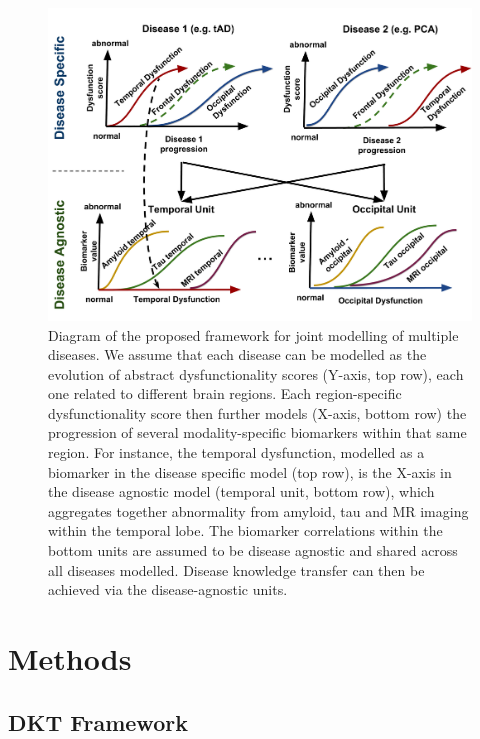 \begin{figure}[h]
 \centering
 \includegraphics[width=1\textwidth,trim=0 0 0 0,clip]{images/disease_knowledge_transfer.pdf}
 \caption[Diagram of the proposed framework for joint modelling of multiple diseases.]{Diagram of the proposed framework for joint modelling of multiple diseases. We assume that each disease can be modelled as the evolution of abstract dysfunctionality scores (Y-axis, top row), each one related to different brain regions. Each region-specific dysfunctionality score then further models (X-axis, bottom row) the progression of several modality-specific biomarkers within that same region. For instance, the temporal dysfunction, modelled as a biomarker in the disease specific model (top row), is the X-axis in the disease agnostic model (temporal unit, bottom row), which aggregates together abnormality from amyloid, tau and MR imaging within the temporal lobe. The biomarker correlations within the bottom units are assumed to be disease agnostic and shared across all diseases modelled. Disease knowledge transfer can then be achieved via the disease-agnostic units.}
 \label{fig:diagram}
\end{figure}

\section{Methods}
\label{sec:dktMet}


\subsection{DKT Framework}
\label{sec:dktMethFramework}
\newcommand{\lp}{\lambda_{d_i}^{\psi(k)}}
\newcommand{\lpuu}{\lambda_{d_i}^{\psi(k),(u)}}
\newcommand{\lpum}{\lambda_{d_i}^{\psi(k),(u-1)}}


